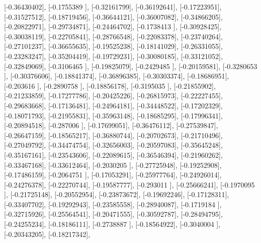 \documentclass{article}
\begin{document}
       [-0.36430402],
       [-0.1755389 ],
       [-0.32161799],
       [-0.36192641],
       [-0.17223951],
       [-0.31527512],
       [-0.18719456],
       [-0.36644121],
       [-0.36007082],
       [-0.34866205],
       [-0.20822971],
       [-0.29734871],
       [-0.24464702],
       [-0.1738413 ],
       [-0.30928425],
       [-0.30038119],
       [-0.22705841],
       [-0.28766548],
       [-0.22083378],
       [-0.23740264],
       [-0.27101237],
       [-0.36655635],
       [-0.19525238],
       [-0.18141029],
       [-0.26331055],
       [-0.23283247],
       [-0.35204419],
       [-0.19729231],
       [-0.30080185],
       [-0.33121052],
       [-0.32849069],
       [-0.3106465 ],
       [-0.19825079],
       [-0.2429485 ],
       [-0.20159581],
       [-0.3280653 ],
       [-0.30376606],
       [-0.18841374],
       [-0.36896385],
       [-0.30303374],
       [-0.18686951],
       [-0.203616  ],
       [-0.2890758 ],
       [-0.18856178],
       [-0.3195035 ],
       [-0.21855902],
       [-0.21233859],
       [-0.17277786],
       [-0.20425226],
       [-0.26815973],
       [-0.22227455],
       [-0.29683668],
       [-0.17136481],
       [-0.24964181],
       [-0.34448522],
       [-0.17202329],
       [-0.18071793],
       [-0.21955831],
       [-0.35963148],
       [-0.18685295],
       [-0.17996341],
       [-0.20894518],
       [-0.287006  ],
       [-0.17699051],
       [-0.36476112],
       [-0.27539847],
       [-0.26647159],
       [-0.18565217],
       [-0.36880744],
       [-0.20702673],
       [-0.21710496],
       [-0.27049792],
       [-0.34474754],
       [-0.32656003],
       [-0.20597083],
       [-0.35645248],
       [-0.35167161],
       [-0.23543606],
       [-0.22089615],
       [-0.36546394],
       [-0.21960262],
       [-0.33467168],
       [-0.33612464],
       [-0.2030205 ],
       [-0.27725948],
       [-0.19252908],
       [-0.17486159],
       [-0.2064751 ],
       [-0.17053291],
       [-0.25977764],
       [-0.24926014],
       [-0.24276378],
       [-0.22270744],
       [-0.19587777],
       [-0.293011  ],
       [-0.25666241],
       [-0.1970095 ],
       [-0.21725148],
       [-0.20552954],
       [-0.23873672],
       [-0.19692246],
       [-0.17128311],
       [-0.33407702],
       [-0.19292943],
       [-0.23585558],
       [-0.28940087],
       [-0.1719184 ],
       [-0.32715926],
       [-0.25564541],
       [-0.20471555],
       [-0.30592787],
       [-0.28494795],
       [-0.24255234],
       [-0.18186111],
       [-0.2738887 ],
       [-0.18564922],
       [-0.3040004 ],
       [-0.20343205],
       [-0.18217342],
\end{document}
